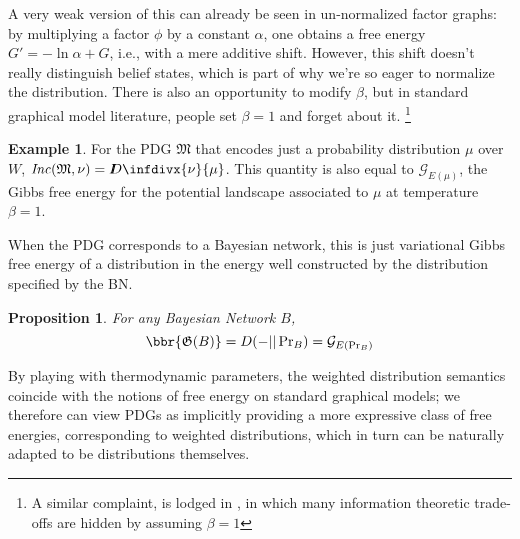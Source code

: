 \documentclass{article}
\theoremstyle{plain}
\newtheorem{prop}[theorem]{Proposition}
\theoremstyle{definition}
\newtheorem{examplex}{Example}
\theoremstyle{remark}
\newcommand{\thickD}{I\mkern-8muD}
\newcommand{\kldiv}{\thickD\infdivx}%
\newcommand{\dg}[1]{\mathfrak{#1}}
\newcommand\Inc{\mathit{Inc}}
\newcommand{\PDGof}[1]{\dg G(#1)}
\numberwithin{equation}{section}
\begin{document}
	A very weak version of this can already be seen in un-normalized factor graphs: by multiplying a factor $\phi$ by a constant $\alpha$, one obtains a free energy $G' = - \ln \alpha + G$, i.e., with a mere additive shift. However, this shift doesn't really distinguish belief states, which is part of why we're so eager to normalize the distribution.
	There is also an opportunity to modify $\beta$, but in standard graphical model literature, people set $\beta = 1$ and forget about it.%
		\footnote{A similar complaint, is lodged in \cite{fixing-broken-elbo}, in which many information theoretic trade-offs are hidden by assuming $\beta = 1$}


	\begin{examplex}%
		\label{ex:energy-from-distrib}
		For the PDG $\dg M$ that encodes just a probability distribution $\mu$ over $W$,  $\Inc(\dg M, \nu) = \kldiv{\nu}{\mu}$. This quantity is also equal to $\mathcal G_{E(\mu)}$, the Gibbs free energy for the potential landscape associated to $\mu$ at temperature $\beta = 1$.
	\end{examplex}


	When the PDG corresponds to a Bayesian network, this is just variational Gibbs free energy of a distribution in the energy well constructed by the distribution specified by the BN.

	\begin{prop}\label{prop:bn-free-energy}
		For any Bayesian Network $B$, 
		\[ \bbr{\PDGof{B}} = D(- || \Pr\nolimits_B) = \mathcal G_{E(\Pr_B)} \]
	\end{prop}
	
	By playing with thermodynamic parameters, the weighted distribution semantics coincide with the notions of free energy on standard graphical models; we therefore can view PDGs as implicitly providing a more expressive class of free energies, corresponding to weighted distributions, which in turn can be naturally adapted to be distributions themselves.
	
\end{document}
